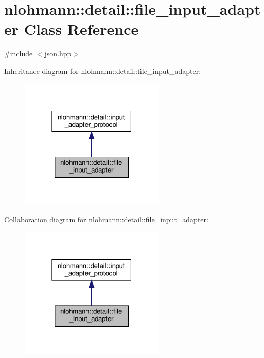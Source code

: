\hypertarget{classnlohmann_1_1detail_1_1file__input__adapter}{}\section{nlohmann\+:\+:detail\+:\+:file\+\_\+input\+\_\+adapter Class Reference}
\label{classnlohmann_1_1detail_1_1file__input__adapter}


{\ttfamily \#include $<$json.\+hpp$>$}



Inheritance diagram for nlohmann\+:\+:detail\+:\+:file\+\_\+input\+\_\+adapter\+:
\nopagebreak
\begin{figure}[H]
\begin{center}
\leavevmode
\includegraphics[width=195pt]{classnlohmann_1_1detail_1_1file__input__adapter__inherit__graph}
\end{center}
\end{figure}


Collaboration diagram for nlohmann\+:\+:detail\+:\+:file\+\_\+input\+\_\+adapter\+:
\nopagebreak
\begin{figure}[H]
\begin{center}
\leavevmode
\includegraphics[width=195pt]{classnlohmann_1_1detail_1_1file__input__adapter__coll__graph}
\end{center}
\end{figure}
